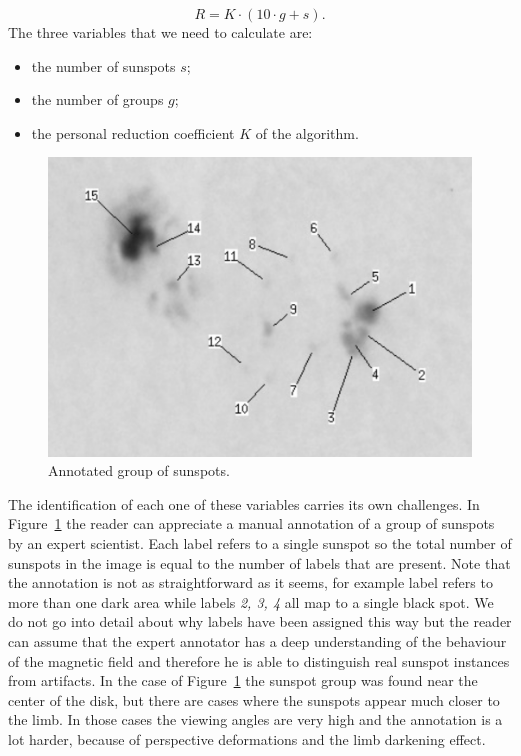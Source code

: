 \begin{equation}
  R = K \cdot (10 \cdot g + s).
\end{equation}
The three variables that we need to calculate are:
\begin{itemize}
  \item the number of sunspots $s$;
  \item the number of groups $g$;
  \item the personal reduction coefficient $K$ of the algorithm.
\end{itemize}
\begin{figure}[t!]
    \centering
    \captionsetup{justification=centering}
    \includegraphics[width=\textwidth]{./pictures/sunspot-annotation}
    \caption{Annotated group of sunspots.}
    \label{fig:sunspot-annotation}
\end{figure}
The identification of each one of these variables carries its own challenges. In Figure~\ref{fig:sunspot-annotation} the reader can appreciate a manual annotation of a group of sunspots by an expert scientist. Each label refers to a single sunspot so the total number of sunspots in the image is equal to the number of labels that are present. Note that the annotation is not as straightforward as it seems, for example label  refers to more than one dark area while labels \textit{2, 3, 4} all map to a single black spot. We do not go into detail about why labels have been assigned this way but the reader can assume that the expert annotator has a deep understanding of the behaviour of the magnetic field and therefore he is able to distinguish real sunspot instances from artifacts.
\bigbreak
\noindent In the case of Figure~\ref{fig:sunspot-annotation} the sunspot group was found near the center of the disk, but there are cases where the sunspots appear much closer to the limb. In those cases the viewing angles are very high and the annotation is a lot harder, because of perspective deformations and the limb darkening effect.
